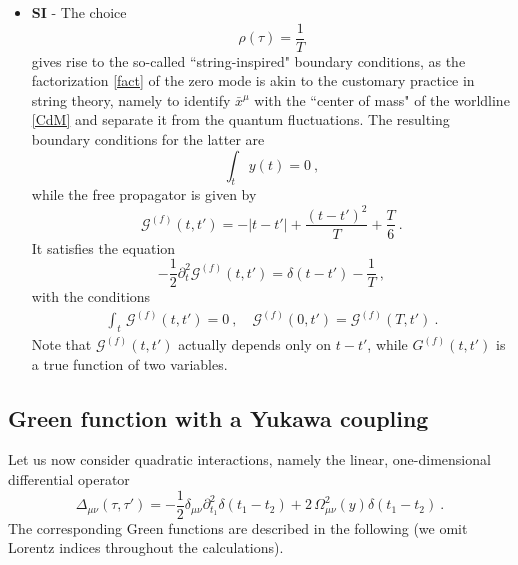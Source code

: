 \documentclass[12pt,a4paper]{article}
\numberwithin{equation}{section}
\numberwithin{equation}{section}
\begin{document}
\begin{itemize}
 \item \textbf{SI} - The choice 
 \begin{equation}
 \rho(\tau)=\frac{1}{T}
 \end{equation}
 gives rise to the so-called ``string-inspired" boundary conditions, as the factorization \eqref{fact} of the zero mode is akin to the customary practice in string theory, namely to identify $\bar{x}^\mu$ with the ``center of mass" of the worldline \eqref{CdM} and separate it from the quantum fluctuations. The resulting boundary conditions for the latter are
 \begin{equation}
 \int_t \, y(t)=0\ ,
 \end{equation}
 while the free propagator is given by
 \begin{equation} \label{freeop2}
 \mathcal{G}^{(f)}(t,t')=-|t-t'|+\frac{(t-t')^2}{T}+\frac{T}{6}\ .
 \end{equation}
 It satisfies the equation 
 \begin{equation}
 -\frac12\partial_t^2\mathcal{G}^{(f)}(t,t')=\delta(t-t')-\frac{1}{T}\ ,
 \end{equation}
 with the conditions
 \begin{align}
 \int_t \, \mathcal{G}^{(f)}(t,t')=0\ , \quad \mathcal{G}^{(f)}(0,t')= \mathcal{G}^{(f)}(T,t')\ .
 \end{align}
 Note that $\mathcal{G}^{(f)}(t,t')$ actually depends only on $t-t'$, while $G^{(f)}(t,t')$ is a true function of two variables.
\end{itemize}


\subsection{Green function with a Yukawa coupling}
Let us now consider quadratic interactions, namely the linear, one-dimensional differential operator
\begin{equation} \label{Delta'}
\Delta_{\mu\nu} (\tau,\tau')=-\frac12 \delta_{\mu\nu}\partial^2_{t_1}\delta(t_1-t_2)+2 \, \Omega^2_{\mu\nu}(y)\delta(t_1-t_2)\ .
\end{equation}
The corresponding Green functions are described in the following (we omit Lorentz indices throughout the calculations).
\end{document}

